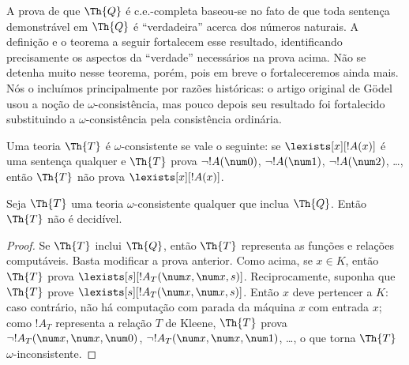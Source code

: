 \documentclass[../../../include/open-logic-section]{subfiles}
\begin{document}


\begin{explain}
A prova de que $\Th{Q}$ é c.e.-completa baseou-se no fato de que toda
sentença demonstrável em $\Th{Q}$ é ``verdadeira'' acerca dos números
naturais. A definição e o teorema a seguir fortalecem esse resultado,
identificando precisamente os aspectos da ``verdade'' necessários na
prova acima. Não se detenha muito nesse teorema, porém, pois em breve o
fortaleceremos ainda mais. Nós o incluímos principalmente por razões
históricas: o artigo original de G\"odel usou a noção de
$\omega$-consistência, mas pouco depois seu resultado foi fortalecido
substituindo a $\omega$-consistência pela consistência ordinária.
\end{explain}

\begin{defn}
Uma teoria $\Th{T}$ é $\omega$-consistente se vale o seguinte: se
$\lexists[x][!A(x)]$ é uma sentença qualquer e $\Th{T}$ prova
$\lnot !A(\num 0)$, $\lnot !A(\num 1)$, $\lnot !A(\num 2)$, \dots,
então $\Th{T}$ não prova $\lexists[x][!A(x)]$.
\end{defn}

\begin{thm}
  Seja $\Th{T}$ uma teoria $\omega$-consistente qualquer que inclua
  $\Th{Q}$. Então $\Th{T}$ não é decidível.
\end{thm}

\begin{proof}
Se $\Th{T}$ inclui $\Th{Q}$, então $\Th{T}$ representa as funções e
relações computáveis. Basta modificar a prova anterior. Como acima, se
$x \in K$, então $\Th{T}$ prova $\lexists[s][!A_T(\num
  x,\num x, s)]$. Reciprocamente, suponha que $\Th{T}$ prove
$\lexists[s][!A_T(\num x, \num x, s)]$. Então $x$ deve pertencer a
$K$: caso contrário, não há computação com parada da máquina $x$ com
entrada $x$; como $!A_T$ representa a relação $T$ de Kleene, $\Th{T}$
prova $\lnot !A_T(\num x, \num x, \num 0)$,
$\lnot !A_T(\num x, \num x, \num 1)$, \dots, o que torna $\Th{T}$
$\omega$-inconsistente.
\end{proof}
\end{document}
